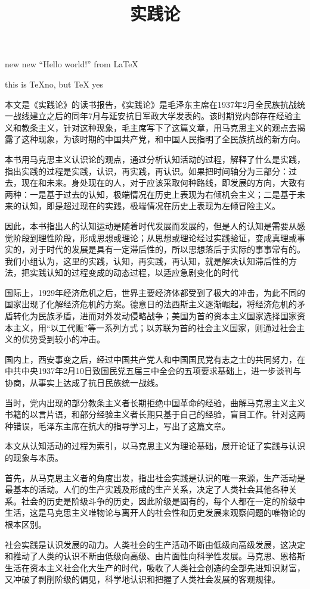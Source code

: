 \documentclass[a4paper, UTF8, twocolumn]{ctexart}
\title{实践论}
\begin{document}
new new 
``Hello world!'' from \LaTeX

this is \TeX no, but \TeX{} yes

本文是《实践论》的读书报告，《实践论》是毛泽东主席在1937年2月全民族抗战统一战线建立之后的同年7月与延安抗日军政大学发表的。该时期党内部存在经验主义和教条主义，针对这种现象，毛主席写下了这篇文章，用马克思主义的观点去揭露了这种现象，为该时期的中国共产党，和中国人民指明了全民族抗战的新方向。

本书用马克思主义认识论的观点，通过分析认知活动的过程，解释了什么是实践，指出实践的过程是实践，认识，再实践，再认识。如果把时间轴分为三部分：过去，现在和未来。身处现在的人，对于应该采取何种路线，即发展的方向，大致有两种：一是基于过去的认知，极端情况在历史上表现为右倾机会主义；二是基于未来的认知，即是超过现在的实践，极端情况在历史上表现为左倾冒险主义。

因此，本书指出人的认知运动是随着时代发展而发展的，但是人的认知是需要从感觉阶段到理性阶段，形成思想或理论；从思想或理论经过实践验证，变成真理或事实的，对于时代的发展是具有一定滞后性的，所以思想落后于实际的事事常有的。我们小组认为，这里的实践，认知，再实践，再认知，就是解决认知滞后性的方法，把实践认知的过程变成的动态过程，以适应急剧变化的时代

国际上，1929年经济危机之后，世界主要经济体都受到了极大的冲击，为此不同的国家出现了化解经济危机的方案。德意日的法西斯主义逐渐崛起，将经济危机的矛盾转化为民族矛盾，进而对外发动侵略战争；美国为首的资本主义国家选择国家资本主义，用“以工代赈”等一系列方式；以苏联为首的社会主义国家，则通过社会主义的优势受到较小的冲击。

国内上，西安事变之后，经过中国共产党人和中国国民党有志之士的共同努力，在中共中央1937年2月10日致国民党五届三中全会的五项要求基础上，进一步谈判与协商，从事实上达成了抗日民族统一战线。

当时，党内出现的部分教条主义者长期拒绝中国革命的经验，曲解马克思主义主义书籍的以言片语，和部分经验主义者长期只基于自己的经验，盲目工作。针对这两种错误，毛泽东主席在抗大的指导学习上，写出了这篇文章。

本文从认知活动的过程为索引，以马克思主义为理论基础，展开论证了实践与认识的现象与本质。

首先，从马克思主义者的角度出发，指出社会实践是认识的唯一来源，生产活动是最基本的活动。人们的生产实践及形成的生产关系，决定了人类社会其他各种关系。社会的历史是阶级斗争的历史，因此阶级是固有的，每个人都在一定的阶级中生活，这是马克思主义唯物论与离开人的社会性和历史发展来观察问题的唯物论的根本区别。

社会实践是认识发展的动力。人类社会的生产活动不断由低级向高级发展，这决定和推动了人类的认识不断由低级向高级、由片面性向科学性发展。马克思、恩格斯生活在资本主义社会化大生产的时代，吸收了人类社会创造的全部先进知识财富，又冲破了剥削阶级的偏见，科学地认识和把握了人类社会发展的客观规律。
\end{document}
